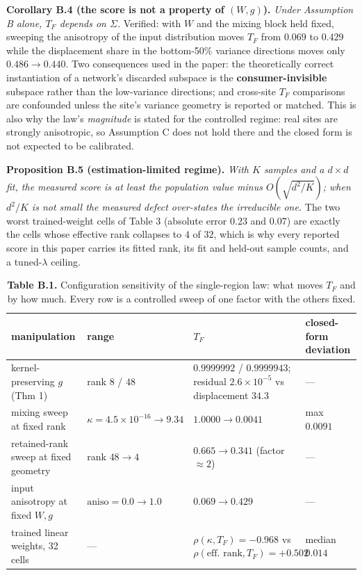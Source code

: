 \textbf{Corollary B.4 (the score is not a property of $(W,g)$).} \textit{Under Assumption B alone, $T_F$ depends on $\Sigma$.} Verified: with $W$ and the mixing block held fixed, sweeping the anisotropy of the input distribution moves $T_F$ from $0.069$ to $0.429$ while the displacement share in the bottom-50\% variance directions moves only $0.486\to0.440$. Two consequences used in the paper: the theoretically correct instantiation of a network's discarded subspace is the \textbf{consumer-invisible} subspace rather than the low-variance directions; and cross-site $T_F$ comparisons are confounded unless the site's variance geometry is reported or matched. This is also why the law's \textit{magnitude} is stated for the controlled regime: real sites are strongly anisotropic, so Assumption C does not hold there and the closed form is not expected to be calibrated.

\textbf{Proposition B.5 (estimation-limited regime).} \textit{With $K$ samples and a $d\times d$ fit, the measured score is at least the population value minus $O(\sqrt{d^2/K})$; when $d^2/K$ is not small the measured defect over-states the irreducible one.} The two worst trained-weight cells of Table 3 (absolute error $0.23$ and $0.07$) are exactly the cells whose effective rank collapses to $4$ of $32$, which is why every reported score in this paper carries its fitted rank, its fit and held-out sample counts, and a tuned-$\lambda$ ceiling.


\begin{table}[t]
\centering
\small
\caption*{\textbf{Table B.1.} Configuration sensitivity of the single-region law: what moves $T_F$ and by how much. Every row is a controlled sweep of one factor with the others fixed.}
\begin{tabularx}{\textwidth}{@{}>{\raggedright\arraybackslash}X >{\raggedright\arraybackslash}X >{\raggedright\arraybackslash}X >{\raggedright\arraybackslash}X@{}}
\toprule
\textbf{manipulation} & \textbf{range} & \textbf{$T_F$} & \textbf{closed-form deviation} \\
\midrule
kernel-preserving $g$ (Thm 1) & rank $8$ / $48$ & $0.9999992$ / $0.9999943$; residual $2.6\times10^{-5}$ vs displacement $34.3$ & --- \\
mixing sweep at fixed rank & $\kappa=4.5\times10^{-16}\to9.34$ & $1.0000\to0.0041$ & max $0.0091$ \\
retained-rank sweep at fixed geometry & rank $48\to4$ & $0.665\to0.341$ (factor $\approx2$) & --- \\
input anisotropy at fixed $W,\allowbreak{}g$ & $\text{aniso}=0.0\to1.0$ & $0.069\to0.429$ & --- \\
trained linear weights, 32 cells & --- & $\rho(\kappa,\allowbreak{}T_F)=-0.968$ vs $\rho(\text{eff. rank},\allowbreak{}T_F)=+0.502$ & median $0.014$ \\
\bottomrule
\end{tabularx}
\end{table}

